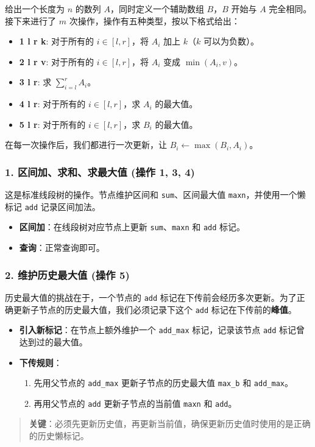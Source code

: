 给出一个长度为 $n$ 的数列 $A$，同时定义一个辅助数组 $B$，$B$ 开始与 $A$ 完全相同。接下来进行了 $m$ 次操作，操作有五种类型，按以下格式给出：

\begin{itemize}
  \item \textbf{1 l r k}: 对于所有的 $i\in[l,r]$，将 $A_i$ 加上 $k$（$k$ 可以为负数）。
  \item \textbf{2 l r v}: 对于所有的 $i\in[l,r]$，将 $A_i$ 变成 $\min(A_i,v)$。
  \item \textbf{3 l r}: 求 $\sum_{i=l}^{r}A_i$。
  \item \textbf{4 l r}: 对于所有的 $i\in[l,r]$，求 $A_i$ 的最大值。
  \item \textbf{5 l r}: 对于所有的 $i\in[l,r]$，求 $B_i$ 的最大值。
\end{itemize}

在每一次操作后，我们都进行一次更新，让 $B_i\gets\max(B_i,A_i)$。

\subsubsection*{1. 区间加、求和、求最大值 (操作 1, 3, 4)}
这是标准线段树的操作。节点维护区间和 \texttt{sum}、区间最大值 \texttt{maxn}，并使用一个懒标记 \texttt{add} 记录区间加法。
\begin{itemize}
\item \textbf{区间加}：在线段树对应节点上更新 \texttt{sum}、\texttt{maxn} 和 \texttt{add} 标记。
\item \textbf{查询}：正常查询即可。
\end{itemize}

\subsubsection*{2. 维护历史最大值 (操作 5)}
历史最大值的挑战在于，一个节点的 \texttt{add} 标记在下传前会经历多次更新。为了正确更新子节点的历史最大值，我们必须记录下这个 \texttt{add} 标记在下传前的\textbf{峰值}。
\begin{itemize}
\item \textbf{引入新标记}：在节点上额外维护一个 \texttt{add\_max} 标记，记录该节点 \texttt{add} 标记曾达到过的最大值。
\item \textbf{下传规则}：
\begin{enumerate}
\item 先用父节点的 \texttt{add\_max} 更新子节点的历史最大值 \texttt{max\_b} 和 \texttt{add\_max}。
\item 再用父节点的 \texttt{add} 更新子节点的当前值 \texttt{maxn} 和 \texttt{add}。
\end{enumerate}
\end{itemize}
\begin{quote}
\textbf{关键}：必须先更新历史值，再更新当前值，确保更新历史值时使用的是正确的历史懒标记。
\end{quote}


